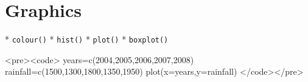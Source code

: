 
\section{Graphics}

*  \texttt{colour()}
*  \texttt{hist()}
*  \texttt{plot()}
*  \texttt{boxplot()}



<pre><code>
years=c(2004,2005,2006,2007,2008)
rainfall=c(1500,1300,1800,1350,1950)
plot(x=years,y=rainfall) 
</code></pre>


